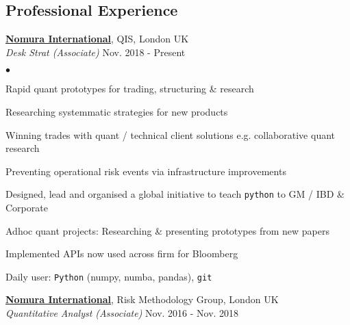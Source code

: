 \documentclass[margin, line]{res}
\newcommand{\Nomura}{http://www.nomura.com}
\newenvironment{list2}{
	\begin{list}{$\bullet$}{%
		\setlength{\itemsep}{0in}
		\setlength{\parsep}{0in} \setlength{\parskip}{0in}
		\setlength{\topsep}{0in} \setlength{\partopsep}{0in}
		\setlength{\leftmargin}{0.2in}}}{\end{list}}
\begin{document}
\begin{resume}
\section{\sc Professional Experience}

{\bf \href{\Nomura}{Nomura International}}, QIS, London UK \\
\vspace{-.3cm}
{\em Desk Strat (Associate)}
    \hfill{Nov. 2018 - Present}\\

\begin{list2}
\item Rapid quant prototypes for trading, structuring \& research
\item Researching systemmatic strategies for new products
\item Winning trades with quant / technical client solutions e.g. collaborative quant research
\item Preventing operational risk events via infrastructure improvements
\item Designed, lead and organised a global initiative to teach \verb|python| to GM / IBD \& Corporate
\item Adhoc quant projects: Researching \& presenting prototypes from new papers
\item Implemented APIs now used across firm for Bloomberg
\item Daily user: \verb|Python| (numpy, numba, pandas), \verb|git|
\end{list2}

{\bf \href{\Nomura}{Nomura International}},
	Risk Methodology Group, London UK \\
\vspace{-.3cm}
{\em Quantitative Analyst (Associate)}
	\hfill{Nov. 2016 - Nov. 2018}\\


\end{resume}
\end{document}
